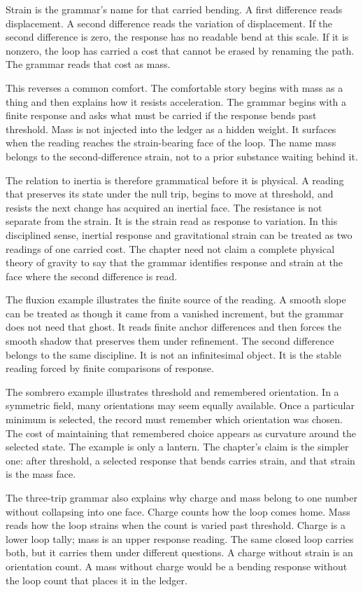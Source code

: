 Strain is the grammar's name for that carried bending. A first difference
reads displacement. A second difference reads the variation of displacement.
If the second difference is zero, the response has no readable bend at this
scale. If it is nonzero, the loop has carried a cost that cannot be erased by
renaming the path. The grammar reads that cost as mass.

This reverses a common comfort. The comfortable story begins with mass as a
thing and then explains how it resists acceleration. The grammar begins with
a finite response and asks what must be carried if the response bends past
threshold. Mass is not injected into the ledger as a hidden weight. It
surfaces when the reading reaches the strain-bearing face of the loop. The
name mass belongs to the second-difference strain, not to a prior substance
waiting behind it.

The relation to inertia is therefore grammatical before it is physical. A
reading that preserves its state under the null trip, begins to move at
threshold, and resists the next change has acquired an inertial face. The
resistance is not separate from the strain. It is the strain read as response
to variation. In this disciplined sense, inertial response and gravitational
strain can be treated as two readings of one carried cost. The chapter need
not claim a complete physical theory of gravity to say that the grammar
identifies response and strain at the face where the second difference is
read.

The fluxion example illustrates the finite source of the reading. A smooth
slope can be treated as though it came from a vanished increment, but the
grammar does not need that ghost. It reads finite anchor differences and
then forces the smooth shadow that preserves them under refinement. The
second difference belongs to the same discipline. It is not an infinitesimal
object. It is the stable reading forced by finite comparisons of response.

The sombrero example illustrates threshold and remembered orientation. In a
symmetric field, many orientations may seem equally available. Once a
particular minimum is selected, the record must remember which orientation
was chosen. The cost of maintaining that remembered choice appears as
curvature around the selected state. The example is only a lantern. The
chapter's claim is the simpler one: after threshold, a selected response
that bends carries strain, and that strain is the mass face.

The three-trip grammar also explains why charge and mass belong to one
number without collapsing into one face. Charge counts how the loop comes
home. Mass reads how the loop strains when the count is varied past
threshold. Charge is a lower loop tally; mass is an upper response reading.
The same closed loop carries both, but it carries them under different
questions. A charge without strain is an orientation count. A mass without
charge would be a bending response without the loop count that places it in
the ledger.


